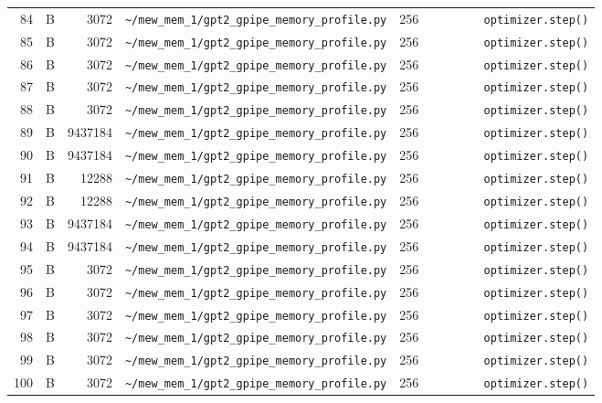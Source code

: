 \documentclass{article}
\begin{document}
\begin{longtable}{r l r p{6.5cm} r p{7.0cm}}
84 & B & 3072 & \lstinline|~/mew_mem_1/gpt2_gpipe_memory_profile.py| & 256 & \lstinline|        optimizer.step()| \\
85 & B & 3072 & \lstinline|~/mew_mem_1/gpt2_gpipe_memory_profile.py| & 256 & \lstinline|        optimizer.step()| \\
86 & B & 3072 & \lstinline|~/mew_mem_1/gpt2_gpipe_memory_profile.py| & 256 & \lstinline|        optimizer.step()| \\
87 & B & 3072 & \lstinline|~/mew_mem_1/gpt2_gpipe_memory_profile.py| & 256 & \lstinline|        optimizer.step()| \\
88 & B & 3072 & \lstinline|~/mew_mem_1/gpt2_gpipe_memory_profile.py| & 256 & \lstinline|        optimizer.step()| \\
89 & B & 9437184 & \lstinline|~/mew_mem_1/gpt2_gpipe_memory_profile.py| & 256 & \lstinline|        optimizer.step()| \\
90 & B & 9437184 & \lstinline|~/mew_mem_1/gpt2_gpipe_memory_profile.py| & 256 & \lstinline|        optimizer.step()| \\
91 & B & 12288 & \lstinline|~/mew_mem_1/gpt2_gpipe_memory_profile.py| & 256 & \lstinline|        optimizer.step()| \\
92 & B & 12288 & \lstinline|~/mew_mem_1/gpt2_gpipe_memory_profile.py| & 256 & \lstinline|        optimizer.step()| \\
93 & B & 9437184 & \lstinline|~/mew_mem_1/gpt2_gpipe_memory_profile.py| & 256 & \lstinline|        optimizer.step()| \\
94 & B & 9437184 & \lstinline|~/mew_mem_1/gpt2_gpipe_memory_profile.py| & 256 & \lstinline|        optimizer.step()| \\
95 & B & 3072 & \lstinline|~/mew_mem_1/gpt2_gpipe_memory_profile.py| & 256 & \lstinline|        optimizer.step()| \\
96 & B & 3072 & \lstinline|~/mew_mem_1/gpt2_gpipe_memory_profile.py| & 256 & \lstinline|        optimizer.step()| \\
97 & B & 3072 & \lstinline|~/mew_mem_1/gpt2_gpipe_memory_profile.py| & 256 & \lstinline|        optimizer.step()| \\
98 & B & 3072 & \lstinline|~/mew_mem_1/gpt2_gpipe_memory_profile.py| & 256 & \lstinline|        optimizer.step()| \\
99 & B & 3072 & \lstinline|~/mew_mem_1/gpt2_gpipe_memory_profile.py| & 256 & \lstinline|        optimizer.step()| \\
100 & B & 3072 & \lstinline|~/mew_mem_1/gpt2_gpipe_memory_profile.py| & 256 & \lstinline|        optimizer.step()| \\

\end{longtable}
\end{document}
